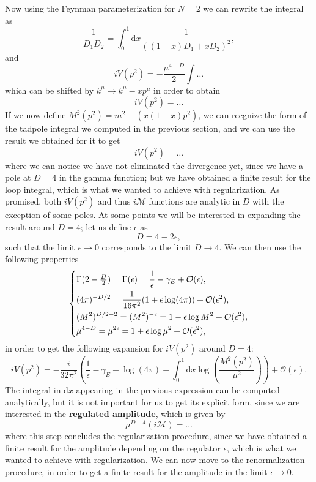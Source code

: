 Now using the Feynman parameterization for \(N=2\) we can rewrite the integral as
\[
    \frac{1}{D_1 D_2} = \int_0^1 \mathrm{d} x \frac{1}{\left( (1-x) D_1 + x D_2 \right)^2},
\]
and
\[
    i V(p^2) = - \frac{\mu^{4-D}}{2} \int \dots
\]
which can be shifted by \(k^{\mu} \to k^{\mu} - x p^{\mu}\) in order to obtain
\[
    i V(p^2) = \dots
\]
If we now define \(M^2(p^2) = m^2 - (x(1-x)p^2)\), we can recgnize the form of the tadpole integral we computed in the previous section, and we can use the result we obtained for it to get
\[
    i V(p^2) = \dots
\]
where we can notice we have not eliminated the divergence yet, since we have a pole at \(D=4\) in the gamma function; but we have obtained a finite result for the loop integral, which is what we wanted to achieve with regularization. As promised, both \(iV(p^2)\) and thus \(i \mathcal{M}\) functions are analytic in \(D\) with the exception of some poles. At some points we will be interested in expanding the result around \(D=4\); let us define \(\epsilon\) as
\[
    D = 4 - 2 \epsilon,
\]
such that the limit \(\epsilon \to 0\) corresponds to the limit \(D \to 4\). We can then use the following properties
\[
    \begin{dcases}
        \Gamma(2-\tfrac{D}{2}) = \Gamma(\epsilon) = \frac{1}{\epsilon} - \gamma_E + \mathcal{O}(\epsilon), \\
        (4\pi)^{-D/2} =   \frac{1}{16 \pi^2} (1 + \epsilon \log(4\pi)) + \mathcal{O}(\epsilon^2),          \\
        (M^2)^{D/2 - 2} = (M^2)^{-\epsilon} = 1 - \epsilon \log M^2 + \mathcal{O}(\epsilon^2),             \\
        \mu^{4-D} = \mu^{2 \epsilon} = 1 + \epsilon \log \mu^2 + \mathcal{O}(\epsilon^2),
    \end{dcases}
\]
in order to get the following expansion for \(i V(p^2)\) around \(D=4\):
\[
    i V(p^2) = - \frac{i}{32 \pi^2} \left(\frac{1}{\epsilon} - \gamma_E + \log(4\pi) - \int_0^1 \mathrm{d} x \log \left( \frac{M^2(p^2)}{\mu^2} \right) \right)+ \mathcal{O}(\epsilon).
\]
The integral in \(\mathrm{d} x\) appearing in the previous expression can be computed analytically, but it is not important for us to get its explicit form, since we are interested in the \textbf{regulated amplitude}, which is given by
\[
    \mu^{D-4} (i \mathcal{M}) =\dots
\]
where this step concludes the regularization procedure, since we have obtained a finite result for the amplitude depending on the regulator \(\epsilon\), which is what we wanted to achieve with regularization. We can now move to the renormalization procedure, in order to get a finite result for the amplitude in the limit \(\epsilon \to 0\).

